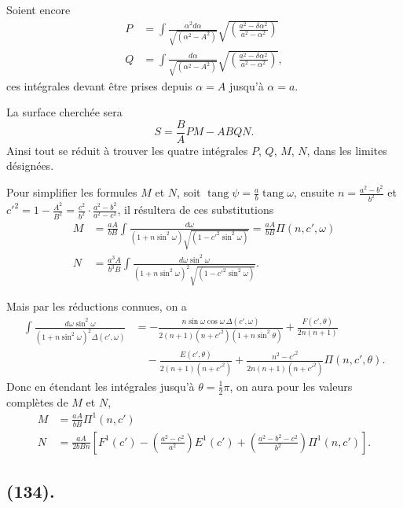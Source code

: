 \documentclass{article}
\begin{document}
Soient encore
\[ \begin{aligned} P&=\int\frac{\alpha^{2}d\alpha}{\sqrt{(\alpha^{2}-A^{2})}}\sqrt{\left(\frac{a^{2}-\delta\alpha^{2}}{a^{2}-\alpha^{2}}\right)}\\ Q&=\int\frac{d\alpha}{\sqrt{(\alpha^{2}-A^{2})}}\sqrt{\left(\frac{a^{2}-\delta\alpha^{2}}{a^{2}-\alpha^{2}}\right)}, \end{aligned} \]
ces intégrales devant être prises depuis $\alpha=A$ jusqu'à $\alpha=a$.

La surface cherchée sera
\[ S=\frac{B}{A}PM-ABQN. \]
Ainsi tout se réduit à trouver les quatre intégrales $P$, $Q$, $M$, $N$, dans les limites désignées.

Pour simplifier les formules $M$ et $N$, soit $\operatorname{tang}\psi=\frac{a}{b}\operatorname{tang}\omega$, ensuite $n=\frac{a^{2}-b^{2}}{b^{2}}$ et $c'^{2}=1-\frac{A^{2}}{B^{2}}=\frac{c^{2}}{b^{2}}\cdot\frac{a^{2}-b^{2}}{a^{2}-c^{2}}$, il résultera de ces substitutions
\[ \begin{aligned} M&=\frac{aA}{bB}\int\frac{d\omega}{(1+n\sin^{2}\omega)\sqrt{(1-c'^{2}\sin^{2}\omega)}}=\frac{aA}{bB}\Pi(n,c',\omega)\\ N&=\frac{a^{3}A}{b^{3}B}\int\frac{d\omega\sin^{2}\omega}{(1+n\sin^{2}\omega)^{2}\sqrt{(1-c'^{2}\sin^{2}\omega)}}. \end{aligned} \]

Mais par les réductions connues, on a
\[ \begin{aligned} \int\frac{d\omega\sin^{2}\omega}{(1+n\sin^{2}\omega)^{2}\Delta(c',\omega)}&=-\frac{n\sin\omega\cos\omega\,\Delta(c',\omega)}{2(n+1)(n+c'^{2})(1+n\sin^{2}\theta)}+\frac{F(c',\theta)}{2n(n+1)}\\ &\quad-\frac{E(c',\theta)}{2(n+1)(n+c'^{2})}+\frac{n^{2}-c'^{2}}{2n(n+1)(n+c'^{2})}\Pi(n,c',\theta). \end{aligned} \]
Donc en étendant les intégrales jusqu'à $\theta=\frac{1}{2}\pi$, on aura pour les valeurs complètes de $M$ et $N$,
\[ \begin{aligned} M&=\frac{aA}{bB}\Pi^{1}(n,c')\\ N&=\frac{aA}{2bBn}\left[F^{1}(c')-\left(\frac{a^{2}-c^{2}}{a^{2}}\right)E^{1}(c')+\left(\frac{a^{2}-b^{2}-c^{2}}{b^{2}}\right)\Pi^{1}(n,c')\right]. \end{aligned} \]

\subsection*{(134).}
\end{document}

